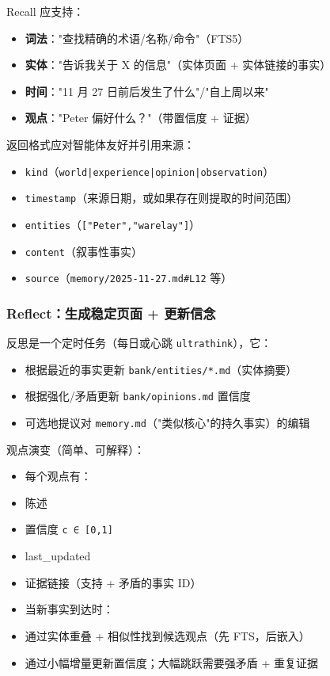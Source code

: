 Recall 应支持：

\begin{itemize}
  \item \textbf{词法}："查找精确的术语/名称/命令"（FTS5）
  \item \textbf{实体}："告诉我关于 X 的信息"（实体页面 + 实体链接的事实）
  \item \textbf{时间}："11 月 27 日前后发生了什么"/"自上周以来"
  \item \textbf{观点}："Peter 偏好什么？"（带置信度 + 证据）
\end{itemize}


返回格式应对智能体友好并引用来源：

\begin{itemize}
  \item \texttt{kind}（\texttt{world|experience|opinion|observation}）
  \item \texttt{timestamp}（来源日期，或如果存在则提取的时间范围）
  \item \texttt{entities}（\texttt{["Peter","warelay"]}）
  \item \texttt{content}（叙事性事实）
  \item \texttt{source}（\texttt{memory/2025-11-27.md\#L12} 等）
\end{itemize}


\subsubsection{Reflect：生成稳定页面 + 更新信念}


反思是一个定时任务（每日或心跳 \texttt{ultrathink}），它：

\begin{itemize}
  \item 根据最近的事实更新 \texttt{bank/entities/*.md}（实体摘要）
  \item 根据强化/矛盾更新 \texttt{bank/opinions.md} 置信度
  \item 可选地提议对 \texttt{memory.md}（"类似核心"的持久事实）的编辑
\end{itemize}


观点演变（简单、可解释）：

\begin{itemize}
  \item 每个观点有：
  \item 陈述
  \item 置信度 \texttt{c ∈ [0,1]}
  \item last\_updated
  \item 证据链接（支持 + 矛盾的事实 ID）
  \item 当新事实到达时：
  \item 通过实体重叠 + 相似性找到候选观点（先 FTS，后嵌入）
  \item 通过小幅增量更新置信度；大幅跳跃需要强矛盾 + 重复证据
\end{itemize}


